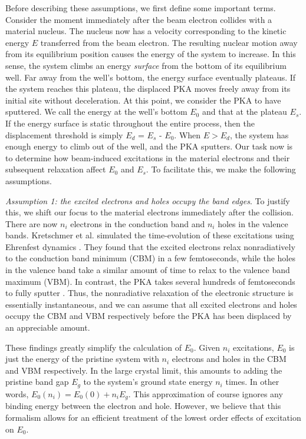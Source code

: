 \documentclass{article}
\begin{document}
Before describing these assumptions, we first define some important terms.
Consider the moment immediately after the beam electron collides with a
material nucleus.
The nucleus now has a velocity corresponding to the kinetic energy
$E$ transferred from the beam electron.
The resulting nuclear motion away from its equilibrium position causes the
energy of the system to increase.
In this sense, the system climbs an energy \textit{surface} from the bottom of its
equilibrium well.
Far away from the well's bottom, the energy surface eventually plateaus.
If the system reaches this plateau, the displaced PKA moves
freely away from its initial site without deceleration. At this point, we
consider the PKA to have sputtered. We call the energy at the well's bottom
$E_0$ and that at the plateau $E_s$.
If the energy surface is static throughout the entire process, then the
displacement threshold is simply $E_d$ = $E_s$ - $E_0$.
When $E>E_d$, the system has enough energy to climb out of the well,
and the PKA sputters.  Our task now is to determine how beam-induced
excitations in the material electrons and their subsequent relaxation affect
$E_0$ and $E_s$.  To facilitate this, we make the following assumptions.

\medskip\noindent
\textit{Assumption 1: the excited electrons and holes occupy the band edges}.
To justify this, we shift our focus to the material electrons immediately after
the collision.  There are now $n_i$ electrons in the conduction band and $n_i$
holes in the valence bands.  Kretschmer et al. simulated the time-evolution of
these excitations using Ehrenfest dynamics \cite{Kretschmer2020,Li2005}.
They found that the excited electrons relax nonradiatively to the conduction
band minimum (CBM) in a few femtoseconds, while the holes in the valence band
take a similar amount of time to relax to the valence band maximum (VBM).
In contrast, the PKA takes several hundreds of femtoseconds to fully sputter
\cite{Yoshimura2018}.
Thus, the nonradiative relaxation of the electronic structure is essentially
instantaneous, and we can assume that all excited electrons and holes occupy
the CBM and VBM respectively before the PKA has been displaced by an
appreciable amount.

These findings greatly simplify the calculation of $E_0$.
Given $n_i$ excitations, $E_0$ is just the energy of the pristine system with
$n_i$ electrons and holes in the CBM and VBM respectively.
In the large crystal limit, this amounts to adding the pristine band gap $E_g$
to the system's ground state energy $n_i$ times.
In other words, $E_0(n_i) = E_0(0) + n_iE_g$.
This approximation of course ignores any binding energy between the electron
and hole.
However, we believe that this formalism allows for an efficient treatment of
the lowest order effects of excitation on $E_0$.
\end{document}
